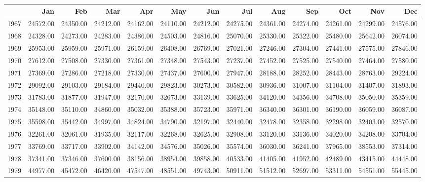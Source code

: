 \begin{longtable}{rrrrrrrrrrrrr}
  \hline
 & Jan & Feb & Mar & Apr & May & Jun & Jul & Aug & Sep & Oct & Nov & Dec \\ 
  \hline
1967 & 24572.00 & 24350.00 & 24212.00 & 24162.00 & 24110.00 & 24212.00 & 24275.00 & 24361.00 & 24274.00 & 24261.00 & 24299.00 & 24576.00 \\ 
  1968 & 24328.00 & 24273.00 & 24283.00 & 24386.00 & 24503.00 & 24816.00 & 25070.00 & 25330.00 & 25322.00 & 25480.00 & 25642.00 & 26074.00 \\ 
  1969 & 25953.00 & 25959.00 & 25971.00 & 26159.00 & 26408.00 & 26769.00 & 27021.00 & 27246.00 & 27304.00 & 27441.00 & 27575.00 & 27846.00 \\ 
  1970 & 27612.00 & 27508.00 & 27330.00 & 27361.00 & 27348.00 & 27543.00 & 27237.00 & 27452.00 & 27525.00 & 27540.00 & 27464.00 & 27580.00 \\ 
  1971 & 27369.00 & 27286.00 & 27218.00 & 27330.00 & 27437.00 & 27600.00 & 27947.00 & 28188.00 & 28252.00 & 28443.00 & 28763.00 & 29224.00 \\ 
  1972 & 29092.00 & 29103.00 & 29184.00 & 29440.00 & 29823.00 & 30273.00 & 30582.00 & 30936.00 & 31007.00 & 31104.00 & 31407.00 & 31893.00 \\ 
  1973 & 31783.00 & 31877.00 & 31947.00 & 32170.00 & 32673.00 & 33139.00 & 33625.00 & 34120.00 & 34356.00 & 34708.00 & 35050.00 & 35359.00 \\ 
  1974 & 35148.00 & 35110.00 & 34860.00 & 35032.00 & 35388.00 & 35723.00 & 35971.00 & 36340.00 & 36301.00 & 36190.00 & 36059.00 & 36087.00 \\ 
  1975 & 35598.00 & 35442.00 & 34997.00 & 34824.00 & 34790.00 & 32197.00 & 32440.00 & 32478.00 & 32358.00 & 32298.00 & 32403.00 & 32570.00 \\ 
  1976 & 32261.00 & 32061.00 & 31935.00 & 32117.00 & 32268.00 & 32625.00 & 32908.00 & 33120.00 & 33136.00 & 34020.00 & 34208.00 & 33704.00 \\ 
  1977 & 33769.00 & 33717.00 & 33902.00 & 34142.00 & 34576.00 & 35026.00 & 35574.00 & 36030.00 & 36241.00 & 37965.00 & 38553.00 & 37314.00 \\ 
  1978 & 37341.00 & 37346.00 & 37600.00 & 38156.00 & 38954.00 & 39858.00 & 40533.00 & 41405.00 & 41952.00 & 42489.00 & 43415.00 & 44448.00 \\ 
  1979 & 44977.00 & 45472.00 & 46420.00 & 47547.00 & 48551.00 & 49743.00 & 50911.00 & 51512.00 & 52697.00 & 53311.00 & 54551.00 & 55445.00 \\ 

\end{longtable}
